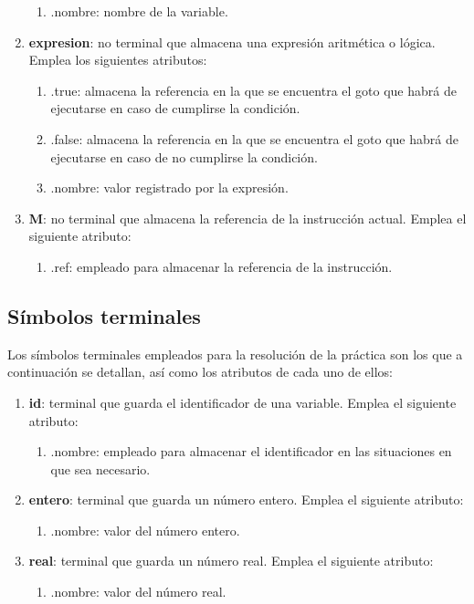 \documentclass[12pt,a4paper, landscape]{article}
\theoremstyle{mytheor}
\begin{document}
\begin{enumerate}
  \begin{enumerate}
    \item .nombre: nombre de la variable.
  \end{enumerate}
  \item \textbf{expresion}: no terminal que almacena una expresión aritmética o lógica. Emplea los siguientes atributos:
  \begin{enumerate}
    \item .true: almacena la referencia en la que se encuentra el goto que habrá de ejecutarse en caso de cumplirse la condición.
    \item .false: almacena la referencia en la que se encuentra el goto que habrá de ejecutarse en caso de no cumplirse la condición.
    \item .nombre: valor registrado por la expresión.
  \end{enumerate}
  \item \textbf{M}: no terminal que almacena la referencia de la instrucción actual. Emplea el siguiente atributo:
  \begin{enumerate}
    \item .ref: empleado para almacenar la referencia de la instrucción.
  \end{enumerate}
\end{enumerate}

\subsection{Símbolos terminales}

Los símbolos terminales empleados para la resolución de la práctica son los que a continuación se detallan, así como los atributos de cada uno de ellos:
\begin{enumerate}
  \item \textbf{id}: terminal que guarda el identificador de una variable. Emplea el siguiente atributo:
  \begin{enumerate}
    \item .nombre: empleado para almacenar el identificador en las situaciones en que sea necesario.
  \end{enumerate}
  \item \textbf{entero}: terminal que guarda un número entero. Emplea el siguiente atributo:
  \begin{enumerate}
    \item .nombre: valor del número entero.
  \end{enumerate}
  \item \textbf{real}: terminal que guarda un número real. Emplea el siguiente atributo:
  \begin{enumerate}
    \item .nombre: valor del número real.
  \end{enumerate}
\end{enumerate}
\end{document}
